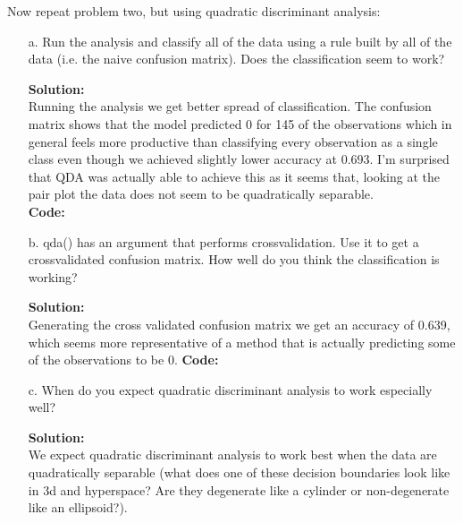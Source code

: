 \documentclass[12pt]{article}
\makeatletter
\theoremstyle{homework}
\newenvironment{exercise}[1]
{\def\@currentlabel{#1}\exercisecore}
{\endexercisecore}
\newcommand{\localhead}[1]{\par\smallskip\noindent\textbf{#1}\nobreak\\}%
\newcommand\solution{\localhead{Solution:}}
\makeatother
\begin{document}
\begin{exercise}{4} Now repeat problem two, but using quadratic discriminant analysis:\\
  \begin{enumerate}
    \item[a.] Run the analysis and classify all of the data using a rule built by all of the data (i.e. the naive confusion matrix). Does the classification seem
    to work?\\
    \solution Running the analysis we get better spread of classification. The confusion matrix shows that the model predicted 0 for 145 of the 
    observations which in general feels more productive than classifying every observation as a single class even though we achieved slightly lower accuracy at 0.693. I'm surprised that QDA was actually able to achieve this 
    as it seems that, looking at the pair plot the data does not seem to be quadratically separable. \\
    \textbf{Code:}
    \begin{center}
    
    \end{center}
    \vspace{.15in}


    \item[b.] qda() has an argument that performs crossvalidation. Use it to get a crossvalidated confusion matrix. How well do you think the
    classification is working?\\
    \solution Generating the cross validated confusion matrix we get an accuracy of 0.639, which seems more representative of a method that is actually predicting some of 
    the observations to be 0.
    \textbf{Code:}
    \begin{center}
    
    \end{center}
    \vspace{.15in}

    \item[c.] When do you expect quadratic discriminant analysis to work especially well?\\
    \solution  We expect quadratic discriminant analysis to work best when the data are quadratically separable (what does one of these decision boundaries look like in 3d and hyperspace? Are they degenerate like a cylinder or 
    non-degenerate like an ellipsoid?).
    \vspace{.15in}




\end{enumerate}
\end{exercise}
\end{document}
